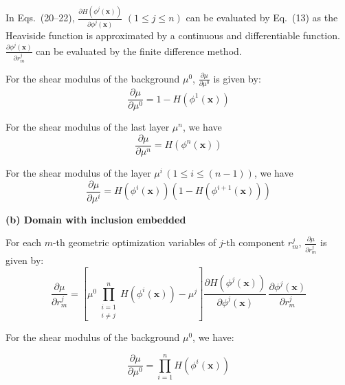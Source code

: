 \documentclass[11pt]{article}
\begin{document}
In Eqs.~(20--22),
$\frac{\partial H(\phi^{j}(\mathbf{x}))}{\partial\phi^{j}(\mathbf{x})}$
$(1 \leq j \leq n)$ can be evaluated by Eq.~(13) as the Heaviside
function is approximated by a continuous and differentiable function.
$\frac{\partial\phi^{j}(\mathbf{x})}{\partial r^{j}_{m}}$ can be
evaluated by the finite difference method.

For the shear modulus of the background $\mu^{0}$,
$\frac{\partial\mu}{\partial\mu^{0}}$ is given by:
\begin{equation}
\frac{\partial\mu}{\partial\mu^{0}} = 1 - H\!\left(\phi^{1}(\mathbf{x})\right)
\end{equation}

For the shear modulus of the last layer $\mu^{n}$, we have
\begin{equation}
\frac{\partial\mu}{\partial\mu^{n}} = H(\phi^{n}(\mathbf{x}))
\end{equation}

For the shear modulus of the layer $\mu^{i}\,(1 \leq i \leq (n-1))$,
we have
\begin{equation}
\frac{\partial\mu}{\partial\mu^{i}}
= H\!\left(\phi^{i}(\mathbf{x})\right)
  \left(1 - H\!\left(\phi^{i+1}(\mathbf{x})\right)\right)
\end{equation}

\medskip
\noindent
\textbf{(b) Domain with inclusion embedded}

\medskip
\noindent
For each $m$-th geometric optimization variables of $j$-th component
$r^{j}_{m}$,
$\frac{\partial\mu}{\partial r^{j}_{m}}$ is given by:
\begin{equation}
\frac{\partial\mu}{\partial r^{j}_{m}}
= \left[\mu^{0}\!\prod_{\substack{i=1 \\ i \neq j}}^{n}
         H\!\left(\phi^{i}(\mathbf{x})\right)
  - \mu^{j}\right]
  \frac{\partial H\!\left(\phi^{j}(\mathbf{x})\right)}{\partial\phi^{j}(\mathbf{x})}\,
  \frac{\partial\phi^{j}(\mathbf{x})}{\partial r^{j}_{m}}
\end{equation}

For the shear modulus of the background $\mu^{0}$, we have:


\newpage

\setcounter{equation}{26}

\begin{equation}
\frac{\partial\mu}{\partial\mu^{0}}
= \prod_{i=1}^{n} H\!\left(\phi^{i}(\mathbf{x})\right)
\end{equation}
\end{document}
